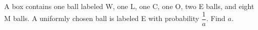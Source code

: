A box contains one ball labeled W, one L, one C, one O, two E balls, and eight M balls. A uniformly chosen ball is labeled E with probability $\dfrac{1}{a}$. Find $a$.

